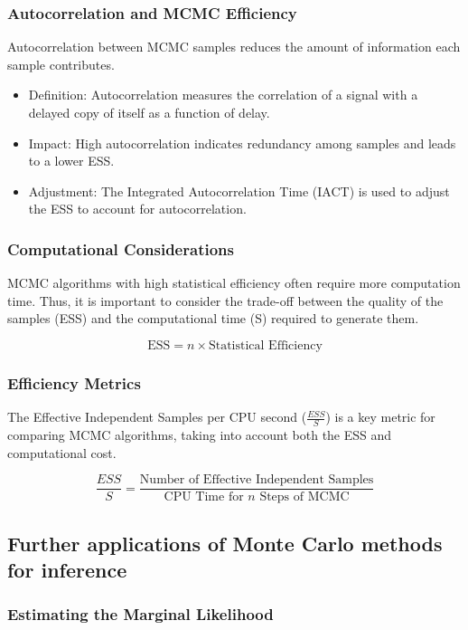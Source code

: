 \documentclass{article}
\begin{document}
\subsubsection{Autocorrelation and MCMC Efficiency}
Autocorrelation between MCMC samples reduces the amount of information each sample contributes. 

\begin{itemize}
    \item Definition: Autocorrelation measures the correlation of a signal with a delayed copy of itself as a function of delay.
    \item Impact: High autocorrelation indicates redundancy among samples and leads to a lower ESS.
    \item Adjustment: The Integrated Autocorrelation Time (IACT) is used to adjust the ESS to account for autocorrelation.
\end{itemize}

\subsubsection{Computational Considerations}
MCMC algorithms with high statistical efficiency often require more computation time. Thus, it is important to consider the trade-off between the quality of the samples (ESS) and the computational time (S) required to generate them.

\begin{equation}
    \text{ESS} = n \times \text{Statistical Efficiency}
\end{equation}

\subsubsection{Efficiency Metrics}
The Effective Independent Samples per CPU second (\( \frac{ESS}{S} \)) is a key metric for comparing MCMC algorithms, taking into account both the ESS and computational cost.

\begin{equation}
    \frac{ESS}{S} = \frac{\text{Number of Effective Independent Samples}}{\text{CPU Time for } n \text{ Steps of MCMC}}
\end{equation}

\subsection{Further applications of Monte Carlo methods for inference
}
\subsubsection{Estimating the Marginal Likelihood}
\end{document}
